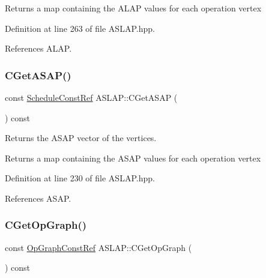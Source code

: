 \begin{DoxyReturn}{Returns}
a map containing the A\+L\+AP values for each operation vertex 
\end{DoxyReturn}


Definition at line 263 of file A\+S\+L\+A\+P.\+hpp.



References A\+L\+AP.

\mbox{\label{classASLAP_ad6058569d9ca53989edd325ded607c04}} 
\subsubsection{\texorpdfstring{C\+Get\+A\+S\+A\+P()}{CGetASAP()}}
{\footnotesize\ttfamily const \hyperlink{schedule_8hpp_a85e4dea8a1611026193d8ca13fc5a260}{Schedule\+Const\+Ref} A\+S\+L\+A\+P\+::\+C\+Get\+A\+S\+AP (\begin{DoxyParamCaption}{ }\end{DoxyParamCaption}) const\hspace{0.3cm}{\ttfamily [inline]}}



Returns the A\+S\+AP vector of the vertices. 

\begin{DoxyReturn}{Returns}
a map containing the A\+S\+AP values for each operation vertex 
\end{DoxyReturn}


Definition at line 230 of file A\+S\+L\+A\+P.\+hpp.



References A\+S\+AP.

\mbox{\label{classASLAP_a382d6ce5ff99ca079e692a3fcfbff5e9}} 
\subsubsection{\texorpdfstring{C\+Get\+Op\+Graph()}{CGetOpGraph()}}
{\footnotesize\ttfamily const \hyperlink{op__graph_8hpp_a9a0b240622c47584bee6951a6f5de746}{Op\+Graph\+Const\+Ref} A\+S\+L\+A\+P\+::\+C\+Get\+Op\+Graph (\begin{DoxyParamCaption}{ }\end{DoxyParamCaption}) const}




